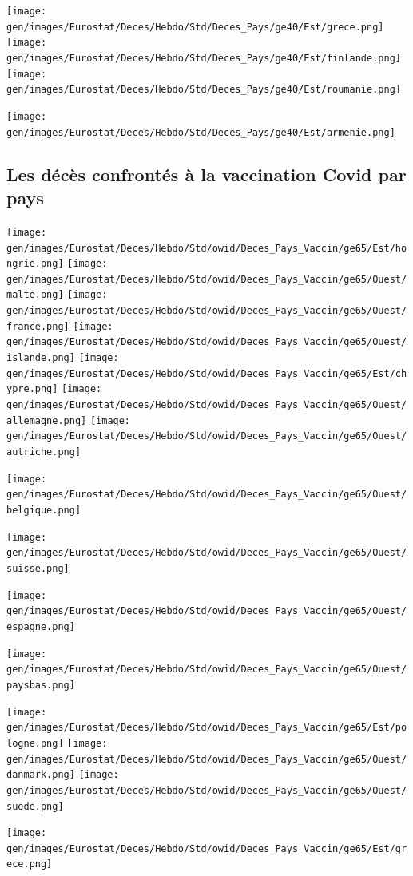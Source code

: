 \documentclass[
]{article}
\begin{document}
\texttt{[image: gen/images/Eurostat/Deces/Hebdo/Std/Deces\_Pays/ge40/Est/grece.png]}
\texttt{[image: gen/images/Eurostat/Deces/Hebdo/Std/Deces\_Pays/ge40/Est/finlande.png]}
\texttt{[image: gen/images/Eurostat/Deces/Hebdo/Std/Deces\_Pays/ge40/Est/roumanie.png]}

\texttt{[image: gen/images/Eurostat/Deces/Hebdo/Std/Deces\_Pays/ge40/Est/armenie.png]}

\hypertarget{les-duxe9cuxe8s-confrontuxe9s-uxe0-la-vaccination-covid-par-pays}{%
\subsection{Les décès confrontés à la vaccination Covid par
pays}\label{les-duxe9cuxe8s-confrontuxe9s-uxe0-la-vaccination-covid-par-pays}}

\texttt{[image: gen/images/Eurostat/Deces/Hebdo/Std/owid/Deces\_Pays\_Vaccin/ge65/Est/hongrie.png]}
\texttt{[image: gen/images/Eurostat/Deces/Hebdo/Std/owid/Deces\_Pays\_Vaccin/ge65/Ouest/malte.png]}
\texttt{[image: gen/images/Eurostat/Deces/Hebdo/Std/owid/Deces\_Pays\_Vaccin/ge65/Ouest/france.png]}
\texttt{[image: gen/images/Eurostat/Deces/Hebdo/Std/owid/Deces\_Pays\_Vaccin/ge65/Ouest/islande.png]}
\texttt{[image: gen/images/Eurostat/Deces/Hebdo/Std/owid/Deces\_Pays\_Vaccin/ge65/Est/chypre.png]}
\texttt{[image: gen/images/Eurostat/Deces/Hebdo/Std/owid/Deces\_Pays\_Vaccin/ge65/Ouest/allemagne.png]}
\texttt{[image: gen/images/Eurostat/Deces/Hebdo/Std/owid/Deces\_Pays\_Vaccin/ge65/Ouest/autriche.png]}

\texttt{[image: gen/images/Eurostat/Deces/Hebdo/Std/owid/Deces\_Pays\_Vaccin/ge65/Ouest/belgique.png]}

\texttt{[image: gen/images/Eurostat/Deces/Hebdo/Std/owid/Deces\_Pays\_Vaccin/ge65/Ouest/suisse.png]}

\texttt{[image: gen/images/Eurostat/Deces/Hebdo/Std/owid/Deces\_Pays\_Vaccin/ge65/Ouest/espagne.png]}

\texttt{[image: gen/images/Eurostat/Deces/Hebdo/Std/owid/Deces\_Pays\_Vaccin/ge65/Ouest/paysbas.png]}

\texttt{[image: gen/images/Eurostat/Deces/Hebdo/Std/owid/Deces\_Pays\_Vaccin/ge65/Est/pologne.png]}
\texttt{[image: gen/images/Eurostat/Deces/Hebdo/Std/owid/Deces\_Pays\_Vaccin/ge65/Ouest/danmark.png]}
\texttt{[image: gen/images/Eurostat/Deces/Hebdo/Std/owid/Deces\_Pays\_Vaccin/ge65/Ouest/suede.png]}

\texttt{[image: gen/images/Eurostat/Deces/Hebdo/Std/owid/Deces\_Pays\_Vaccin/ge65/Est/grece.png]}
\end{document}
